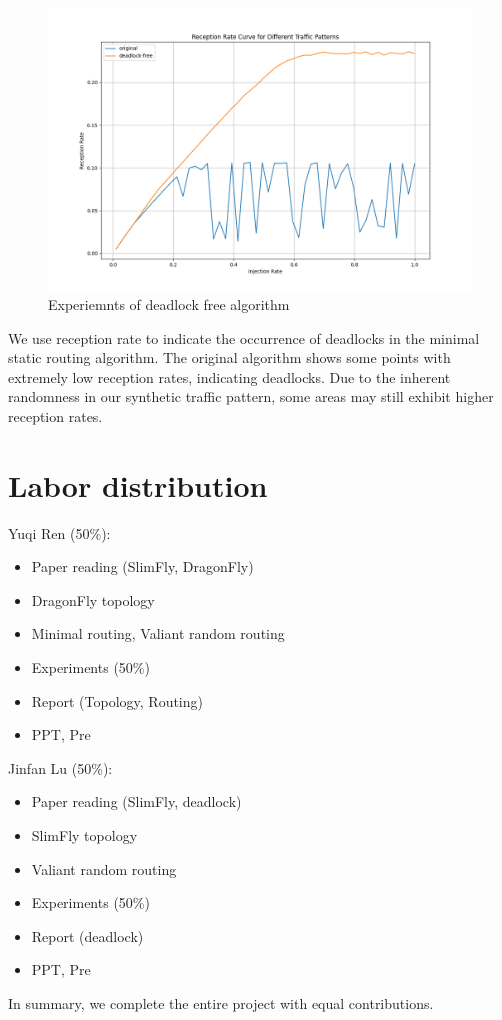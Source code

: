 \documentclass[utf8]{article}
\begin{document}
\begin{figure}[H]
    \centering
    \includegraphics[width=0.85\linewidth]{deadlock.png}
    \caption{Experiemnts of deadlock free algorithm}
\end{figure}

We use reception rate to indicate the occurrence of deadlocks in the minimal static routing algorithm. The original algorithm shows some points with extremely low reception rates, indicating deadlocks. Due to the inherent randomness in our synthetic traffic pattern, some areas may still exhibit higher reception rates.

\section{Labor distribution}
Yuqi Ren (50\%):
\begin{itemize}
    \item Paper reading (SlimFly, DragonFly)
    \item DragonFly topology
    \item Minimal routing, Valiant random routing
    \item Experiments (50\%)
    \item Report (Topology, Routing)
    \item PPT, Pre
\end{itemize}
Jinfan Lu (50\%):
\begin{itemize}
    \item Paper reading (SlimFly, deadlock)
    \item SlimFly topology
    \item Valiant random routing
    \item Experiments (50\%)
    \item Report (deadlock)
    \item PPT, Pre
\end{itemize}
In summary, we complete the entire project with equal contributions.
\end{document}
